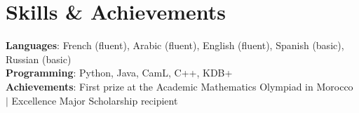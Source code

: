 \documentclass[letterpaper,11pt]{article}
\begin{document}
\section{Skills \& Achievements}
 \begin{itemize}[leftmargin=0.15in, label={}]
    \small{\item{
     \textbf{Languages}{: French (fluent), Arabic (fluent), English (fluent), Spanish (basic), Russian (basic)} \\
     \textbf{Programming}{: Python, Java, CamL, C++, KDB+} \\
     \textbf{Achievements}{: First prize at the Academic Mathematics Olympiad in Morocco $|$ Excellence Major Scholarship recipient}
    }}
 \end{itemize}

\end{document}
